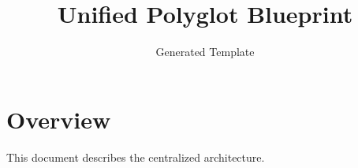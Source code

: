 \documentclass{article}
\begin{document}
\title{Unified Polyglot Blueprint}
\author{Generated Template}
\maketitle

\section{Overview}
This document describes the centralized architecture.
\end{document}
